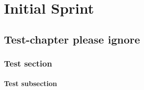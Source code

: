 \part{Initial Sprint}
\chapter{Test-chapter please ignore}
\section{Test section}
\subsection{Test subsection}
